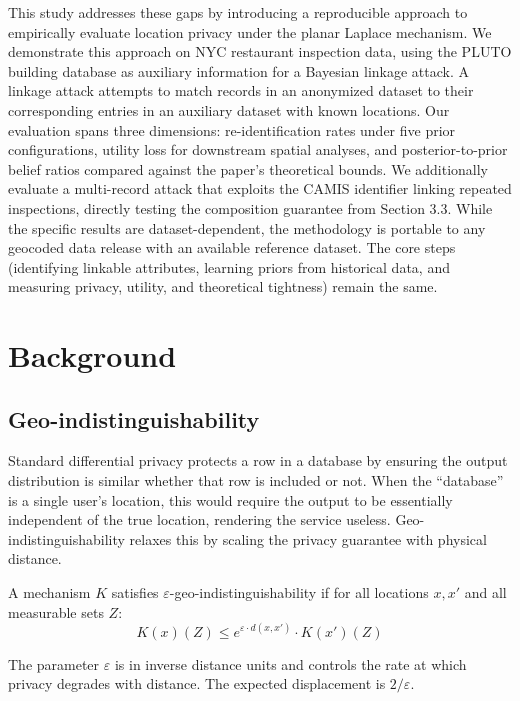 \documentclass[11pt]{article}
\begin{document}
This study addresses these gaps by introducing a reproducible approach to empirically evaluate location privacy under the planar Laplace mechanism. We demonstrate this approach on NYC restaurant inspection data, using the PLUTO building database as auxiliary information for a Bayesian linkage attack. A linkage attack attempts to match records in an anonymized dataset to their corresponding entries in an auxiliary dataset with known locations. Our evaluation spans three dimensions: re-identification rates under five prior configurations, utility loss for downstream spatial analyses, and posterior-to-prior belief ratios compared against the paper's theoretical bounds. We additionally evaluate a multi-record attack that exploits the CAMIS identifier linking repeated inspections, directly testing the composition guarantee from Section 3.3. While the specific results are dataset-dependent, the methodology is portable to any geocoded data release with an available reference dataset. The core steps (identifying linkable attributes, learning priors from historical data, and measuring privacy, utility, and theoretical tightness) remain the same.

\section{Background}

\subsection{Geo-indistinguishability}

Standard differential privacy protects a row in a database by ensuring the output distribution is similar whether that row is included or not. When the ``database'' is a single user's location, this would require the output to be essentially independent of the true location, rendering the service useless. Geo-indistinguishability relaxes this by scaling the privacy guarantee with physical distance.

A mechanism $K$ satisfies $\varepsilon$-geo-indistinguishability if for all locations $x, x'$ and all measurable sets $Z$:
\begin{equation}
K(x)(Z) \leq e^{\varepsilon \cdot d(x,x')} \cdot K(x')(Z)
\end{equation}

The parameter $\varepsilon$ is in inverse distance units and controls the rate at which privacy degrades with distance. The expected displacement is $2/\varepsilon$.
\end{document}
